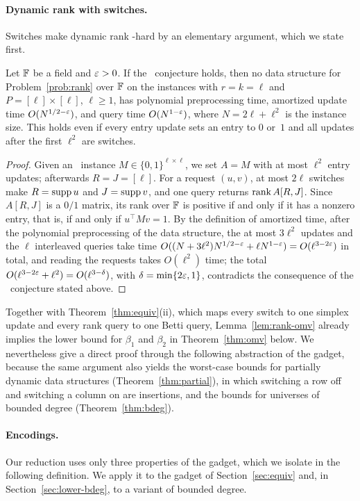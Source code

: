 \paragraph{Dynamic rank with switches.}
Switches make dynamic rank \OMv-hard by an elementary argument, which we state first.

\begin{lemma}\label{lem:rank-omv}
Let $\mathbb{F}$ be a field and $\varepsilon>0$.
If the \OMv\ conjecture holds, then no data structure for Problem~\ref{prob:rank} over $\mathbb{F}$ on the instances with $r=k=\ell$ and $P=[\ell]\times[\ell]$, $\ell\ge1$, has polynomial preprocessing time, amortized update time $O(N^{1/2-\varepsilon})$, and query time $O(N^{1-\varepsilon})$, where $N=2\ell+\ell^2$ is the instance size.
This holds even if every entry update sets an entry to $0$ or~$1$ and all updates after the first $\ell^2$ are switches.
\end{lemma}

\begin{proof}
Given an \OuMv\ instance $M\in\{0,1\}^{\ell\times\ell}$, we set $A=M$ with at most $\ell^2$ entry updates; afterwards $R=J=[\ell]$.
For a request $(u,v)$, at most $2\ell$ switches make $R=\operatorname{supp} u$ and $J=\operatorname{supp} v$, and one query returns $\operatorname{rank} A[R,J]$.
Since $A[R,J]$ is a $0/1$ matrix, its rank over $\mathbb{F}$ is positive if and only if it has a nonzero entry, that is, if and only if $u^{\top}Mv=1$.
By the definition of amortized time, after the polynomial preprocessing of the data structure, the at most $3\ell^2$ updates and the $\ell$ interleaved queries take time $O((N+3\ell^2)N^{1/2-\varepsilon}+\ell N^{1-\varepsilon})=O(\ell^{3-2\varepsilon})$ in total, and reading the requests takes $O(\ell^2)$ time; the total $O(\ell^{3-2\varepsilon}+\ell^2)=O(\ell^{3-\delta})$, with $\delta=\min\{2\varepsilon,1\}$, contradicts the consequence of the \OMv\ conjecture stated above.
\end{proof}

Together with Theorem~\ref{thm:equiv}(ii), which maps every switch to one simplex update and every rank query to one Betti query, Lemma~\ref{lem:rank-omv} already implies the lower bound for $\beta_1$ and $\beta_2$ in Theorem~\ref{thm:omv} below.
We nevertheless give a direct proof through the following abstraction of the gadget, because the same argument also yields the worst-case bounds for partially dynamic data structures (Theorem~\ref{thm:partial}), in which switching a row off and switching a column on are insertions, and the bounds for universes of bounded degree (Theorem~\ref{thm:bdeg}).

\paragraph{Encodings.}
Our reduction uses only three properties of the gadget, which we isolate in the following definition.
We apply it to the gadget of Section~\ref{sec:equiv} and, in Section~\ref{sec:lower-bdeg}, to a variant of bounded degree.


